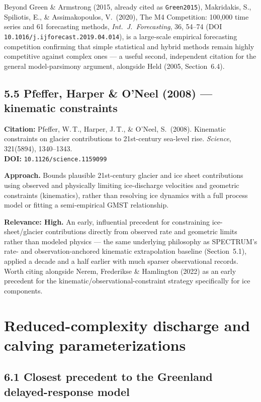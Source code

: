 \documentclass[11pt]{article}
\begin{document}
Beyond Green \& Armstrong (2015, already cited as \texttt{Green2015}),
Makridakis, S., Spiliotis, E., \& Assimakopoulos, V.\ (2020), The M4
Competition: 100,000 time series and 61 forecasting methods,
\textit{Int.\ J.\ Forecasting}, 36, 54--74 (DOI
\texttt{10.1016/j.ijforecast.2019.04.014}), is a large-scale empirical
forecasting competition confirming that simple statistical and hybrid
methods remain highly competitive against complex ones --- a useful second,
independent citation for the general model-parsimony argument, alongside
Held (2005, Section~6.4).

\subsection*{5.5 Pfeffer, Harper \& O'Neel (2008) --- kinematic constraints}

\noindent\textbf{Citation:} Pfeffer, W.\,T., Harper, J.\,T.,
\& O'Neel, S.\ (2008). Kinematic constraints on glacier contributions to
21st-century sea-level rise. \textit{Science}, 321(5894), 1340--1343.\\
\textbf{DOI:} \texttt{10.1126/science.1159099}

\noindent\textbf{Approach.} Bounds plausible 21st-century glacier and ice
sheet contributions using observed and physically limiting ice-discharge
velocities and geometric constraints (kinematics), rather than resolving ice
dynamics with a full process model or fitting a semi-empirical GMST
relationship.

\noindent\textbf{Relevance: High.} An early, influential precedent for
constraining ice-sheet/glacier contributions directly from observed rate
and geometric limits rather than modeled physics --- the same underlying
philosophy as SPECTRUM's rate- and observation-anchored kinematic
extrapolation baseline (Section~5.1), applied a decade and a half earlier
with much sparser observational records. Worth citing alongside Nerem,
Frederikse \& Hamlington (2022) as an early precedent for the
kinematic/observational-constraint strategy specifically for ice
components.

\section{Reduced-complexity discharge and calving parameterizations}

\subsection*{6.1 Closest precedent to the Greenland delayed-response model}
\end{document}
